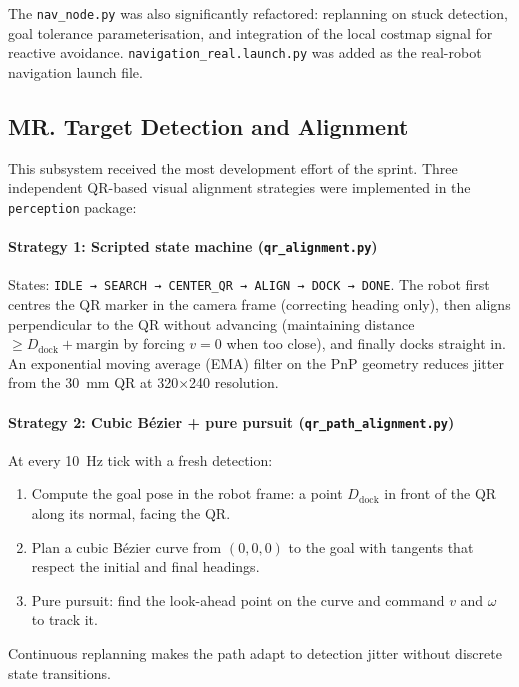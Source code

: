 \documentclass[conference]{IEEEtran}
\begin{document}
The \texttt{nav\_node.py} was also significantly refactored:
replanning on stuck detection, goal tolerance parameterisation, and
integration of the local costmap signal for reactive avoidance.
\texttt{navigation\_real.launch.py} was added as the real-robot
navigation launch file.

\subsection{MR. Target Detection and Alignment}

This subsystem received the most development effort of the sprint. Three
independent QR-based visual alignment strategies were implemented in the
\texttt{perception} package:

\paragraph{Strategy 1: Scripted state machine (\texttt{qr\_alignment.py})}

States: \texttt{IDLE → SEARCH → CENTER\_QR → ALIGN → DOCK → DONE}.
The robot first centres the QR marker in the camera frame (correcting heading
only), then aligns perpendicular to the QR without advancing (maintaining
distance $\geq D_{\text{dock}} + \text{margin}$ by forcing $v=0$ when too
close), and finally docks straight in. An exponential moving average (EMA)
filter on the PnP geometry reduces jitter from the 30~mm QR at 320$\times$240
resolution.

\paragraph{Strategy 2: Cubic Bézier + pure pursuit
(\texttt{qr\_path\_alignment.py})}

At every 10~Hz tick with a fresh detection:
\begin{enumerate}[noitemsep, leftmargin=*]
  \item Compute the goal pose in the robot frame: a point $D_{\text{dock}}$
        in front of the QR along its normal, facing the QR.
  \item Plan a cubic Bézier curve from $(0,0,0)$ to the goal with tangents
        that respect the initial and final headings.
  \item Pure pursuit: find the look-ahead point on the curve and command
        $v$ and $\omega$ to track it.
\end{enumerate}
Continuous replanning makes the path adapt to detection jitter without
discrete state transitions.
\end{document}
